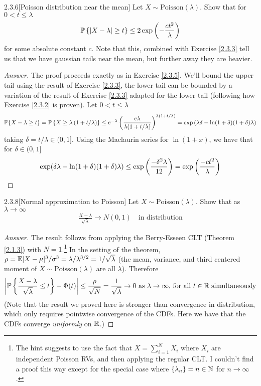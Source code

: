 {\begin{ex}{2.3.6}[Poisson distribution near the mean]\label{2.3.6}
Let $X \sim \text{Poisson}(\lambda)$. Show that for $0 < t \leq \lambda$
\begin{align*}
    \mathbb{P} \left\{ |X - \lambda| \geq  t \right\} \leq 2\exp\left(- \frac {ct^2} \lambda \right)
\end{align*}
for some absolute constant $c$. Note that this, combined with Exercise \ref{2.3.3} tell us that we have gaussian tails near the mean, but further away they are heavier.
\end{ex}
\begin{proof}[Answer]
The proof proceeds exactly as in Exercise \ref{2.3.5}. We'll bound the upper tail using the result of Exercise \ref{2.3.3}, the lower tail can be bounded by a variation of the result of Exercise \ref{2.3.3} adapted for the lower tail (following how Exercise \ref{2.3.2} is proven). Let $0 < t \leq \lambda$
\begin{align*}
    \mathbb{P} \{X - \lambda \geq t\} =  \mathbb{P} \left\{X \geq \lambda \left(1 +  t/\lambda\right)\right\} \leq e^{-\lambda}\left(\frac {e\lambda} {\lambda(1 + t/\lambda)}\right)^{\lambda(1+t/\lambda)} = \exp \left(\lambda\delta - \ln(1+\delta)(1+\delta)\lambda\right)
\end{align*}
taking $\delta = t/\lambda \in (0,1]$. Using the Maclaurin series for $\ln(1+x)$, we have that for $\delta \in (0,1]$
\begin{align*}
    \exp(\delta\lambda - \ln(1 + \delta)(1+\delta)\lambda) \leq \exp \left(\frac {-\delta^2\lambda} {12}\right) =  \exp\left(\frac {-ct^2} {\lambda}\right)
\end{align*}
\end{proof}
\begin{ex}{2.3.8}[Normal approximation to Poisson]\label{2.3.8}
Let $X \sim \text{Poisson}(\lambda)$. Show that as $\lambda\to\infty$
\begin{align*}
    \frac {X - \lambda} {\sqrt{\lambda}} \to N(0,1) \quad\text{in distribution}
\end{align*}
\end{ex}
\begin{proof}[Answer]
The result follows from applying the Berry-Esseen CLT (Theorem \ref{2.1.3}) with $N=1$.\footnote{The hint suggests to use the fact that $X = \sum_{i=1}^N X_i$ where $X_i$ are independent Poisson RVs, and then applying the regular CLT. I couldn't find a proof this way except for the special case where $\{\lambda_n\} = n \in \mathbb{N}$ for $n \to \infty$.} In the setting of the theorem, $\rho = \mathbb{E} | X - \mu|^3/\sigma^3 = \lambda/\lambda^{3/2}=1/\sqrt{\lambda}$ (the mean, variance, and third centered moment of $X\sim \text{Poisson}(\lambda)$ are all $\lambda$). Therefore
\begin{align*}
    \left|\mathbb{P}\left\{\frac {X-\lambda}{\sqrt{\lambda}} \leq t\right\} - \Phi(t)\right| \leq \frac \rho {\sqrt{N}} = \frac 1 {\sqrt{\lambda}} \to 0 \text{ as $\lambda\to \infty$, for all $t\in \mathbb{R}$ simultaneously}
\end{align*}
(Note that the result we proved here is stronger than convergence in distribution, which only requires pointwise convergence of the CDFs. Here we have that the CDFs converge \textit{uniformly} on $\mathbb{R}$.)
\end{proof}

}
